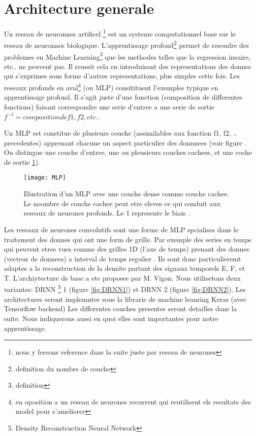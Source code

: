 
\section{Architecture generale}

Un reseau de neuronnes artificel \footnote{nous y fereons reference dans la suite juste par reseau de neurones} est un systeme computationnel base sur le reseau de neuronnes biologique. L'apprentissage profond\footnote{definition du nombre de couche} permet de resoudre des problemes en Machine Learning\footnote{definition} que les methodes telles que la regression ineaire, etc.. ne peuvent pas. Il reussit cela en introduisant des representations des donnes qui s'exprimes sous forme d'autres representations, plus simples cette fois. Les reseaux profonds en aval\footnote{en oposition a un reseau de neurones recurrent qui reutilisent els resultats des model pour s'ameliorer} (ou MLP) consitituent l'exemples typique en apprentissage profond. Il s'agit juste d'une fonction (composition de differentes fonctions) faisant correspondre une serie d'entree a une serie de sortie $f^{-1} = composition de f1, f2, etc.$.

Un MLP est constitue de plusieurs couche (assimilables aux fonction f1, f2, .. precedentes) apprenant chacune un aspect particulier des donnnees (voir figure . On distingue une couche d'entree, une ou pleusieurs couches cachees, et une coche de sortie \ref{fig:MLP}).


\begin{figure}[!h]
\centering
\texttt{[image: MLP]} 
\decoRule
\caption[MLP]{Illustration d'un MLP avec une couche dense comme couche cachee. Le noombre de couche cachee peut etre elevee ce qui conduit aux reseaux de neurones profonds. Le 1 represente le biais \parencite[286]{Reference8}.}
\label{fig:MLP}
\end{figure}

Les reseaux de neurones convolutifs sont une forme de MLP spcialises dans le traitement des donnes qui ont une form de grille. Par exemple des series en temps qui peuvent etres vues comme des grilles 1D (l'axe de temps) prenant des donnes (vecteur de donnees) a interval de temps regulier \parencite{Reference5}. Ils sont donc particulieremt adaptes a la reconstruction de la densite partant des signaux temporels E, F, et T. L'archiytecture de base a ete proposee par M. Vigon. Nous utilisetons deux variantes: DRNN \footnote{Density Reconstruction Neural Network} 1 (figure \ref{fig:DRNN1}) et DRNN 2 (figure \ref{fig:DRNN2}).  Les architectures seront implemntee sous la librarie de machine leanring Keras (avec Tensorflow backend) Les differentes couches presentes seront detailles dans la suite. Nous indiquerons aussi en quoi elles sont importantes pour notre apprentissage.

